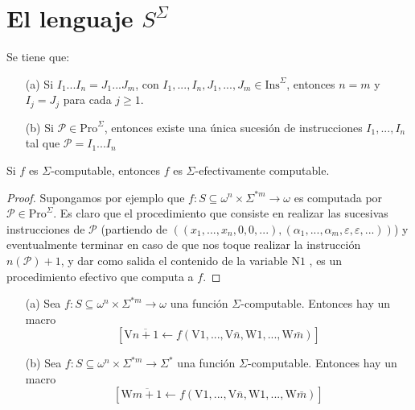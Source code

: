 \section{El lenguaje ${S}^{\Sigma}$}

  \begin{lemma} Se tiene que:
    \begin{itemize}
      \item[(a)]  Si \(I_{1}...I_{n}=J_{1}...J_{m}\), con \( I_{1},...,I_{n},J_{1},...,J_{m}\in \mathrm{Ins}^{\Sigma }\), 
                  entonces \(n=m\) y \(I_{j}=J_{j}\) para cada \(j\geq 1\).
      \item[(b)]  Si \(\mathcal{P}\in \mathrm{Pro}^{\Sigma }\), entonces existe una única sucesión de instrucciones 
                  \(I_{1},...,I_{n}\) tal que \(\mathcal{P} =I_{1}...I_{n}\)
    \end{itemize}
  \end{lemma}

  \begin{theorem}
    Si \(f\) es \(\Sigma \)-computable, entonces \(f\) es \(\Sigma \)-efectivamente computable.
  \begin{proof}
    Supongamos por ejemplo que \(f:S\subseteq \omega ^{n}\times \Sigma ^{\ast m}\rightarrow \omega \) es computada por
    \(\mathcal{P}\in \mathrm{Pro}^{\Sigma }\). Es claro que el procedimiento que consiste en realizar las sucesivas
    instrucciones de \(\mathcal{P}\) (partiendo de \(((x_{1},...,x_{n},0,0,...),( \alpha _{1},...,\alpha _{m},
    \varepsilon ,\varepsilon ,...))\)) y eventualmente terminar en caso de que nos toque realizar la instrucción
    \(n( \mathcal{P})+1\), y dar como salida el contenido de la variable \(\mathrm{N}1\) , es un procedimiento efectivo
    que computa a \(f\).
  \end{proof}
  \end{theorem}

  \begin{proposition}
    \begin{itemize}
      \item[(a)]  Sea \(f:S\subseteq \omega ^{n}\times \Sigma ^{\ast m}\rightarrow \omega \) una función 
                  \(\Sigma \)-computable. Entonces hay un macro
                  \[
                  \displaystyle \left[ \mathrm{V}\overline{n+1}\leftarrow f(\mathrm{V}1,...,\mathrm{V}\bar{n} ,
                  \mathrm{W}1,...,\mathrm{W}\bar{m})\right]
                  \]
      \item[(b)]  Sea \(f:S\subseteq \omega ^{n}\times \Sigma ^{\ast m}\rightarrow \Sigma ^{\ast }\) una función
                  \(\Sigma \)-computable. Entonces hay un macro
                  \[
                  \displaystyle \left[ \mathrm{W}\overline{m+1}\leftarrow f(\mathrm{V}1,...,\mathrm{V}\bar{n} ,
                  \mathrm{W}1,...,\mathrm{W}\bar{m})\right]
                  \]
    \end{itemize}
  \end{proposition}

